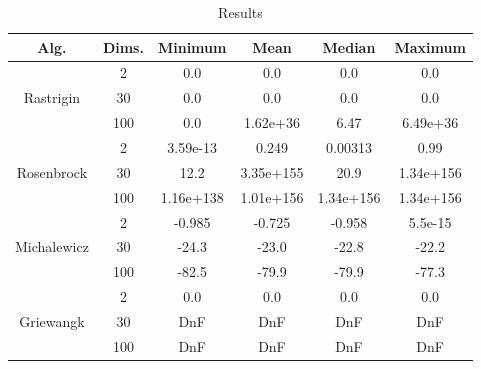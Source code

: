 \documentclass[conference]{IEEEtran}
\begin{document}
\begin{table}[!htbp]
    \caption{Results}
    \centering
    \begin{tabular}{|c c|c c c c|}
        \hline
        Alg. & Dims. & Minimum & Mean & Median & Maximum \\
        \hline
        \multirow{3}{*}{Rastrigin} & 2 & 0.0 & 0.0 & 0.0 & 0.0 \\
        & 30 & 0.0 & 0.0 & 0.0 & 0.0 \\
        & 100 & 0.0 & 1.62e+36 & 6.47 & 6.49e+36 \\
        \hline
        \multirow{3}{*}{Rosenbrock} & 2 & 3.59e-13 & 0.249 & 0.00313 & 0.99 \\
        & 30 & 12.2 & 3.35e+155 & 20.9 & 1.34e+156 \\
        & 100 & 1.16e+138 & 1.01e+156 & 1.34e+156 & 1.34e+156 \\
        \hline
        \multirow{3}{*}{Michalewicz} & 2 & -0.985 & -0.725 & -0.958 & 5.5e-15 \\
        & 30 & -24.3 & -23.0 & -22.8 & -22.2 \\
        & 100 & -82.5 & -79.9 & -79.9 & -77.3 \\
        \hline
        \multirow{3}{*}{Griewangk} & 2 & 0.0 & 0.0 & 0.0 & 0.0 \\
        & 30 & DnF & DnF & DnF & DnF \\
        & 100 & DnF & DnF & DnF & DnF \\
        \hline
    \end{tabular}
\end{table}
\end{document}
